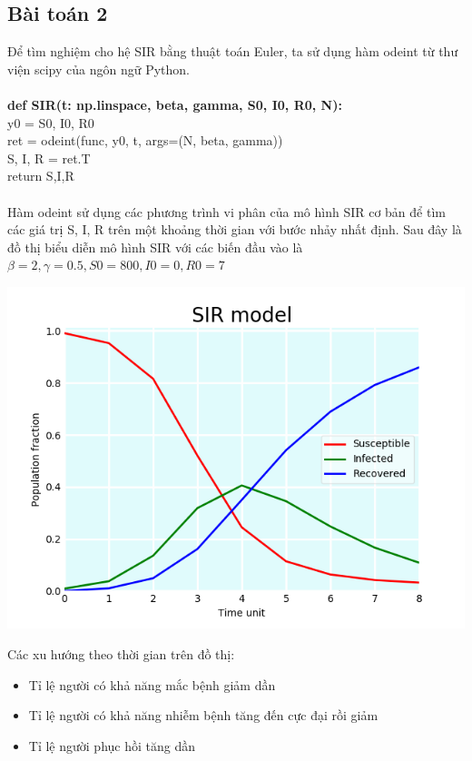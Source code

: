 \documentclass[a4paper]{article}
\begin{document}
\subsection{Bài toán 2}  
Để tìm nghiệm cho hệ SIR bằng thuật toán Euler, ta sử dụng hàm odeint từ thư viện scipy của ngôn ngữ Python.\\ \\
 \textbf{\quad def  SIR(t: np.linspace, beta, gamma, S0, I0, R0, N): \\}
\null \qquad \qquad y0 = S0, I0, R0 \\ 
\null \qquad \qquad ret = odeint(func, y0, t, args=(N, beta, gamma)) \\ 
\null \qquad \qquad S, I, R = ret.T \\ 
\null \qquad \qquad return S,I,R \\ \\
Hàm odeint sử dụng các phương trình vi phân của mô hình SIR cơ bản để tìm các giá trị S, I, R trên một khoảng thời gian với bước nhảy nhất định.
Sau đây là đồ thị biểu diễn mô hình SIR với các biến đầu vào là $\beta=2, \gamma=0.5, S0=800, I0=0, R0=7$
\begin{center}
\includegraphics[scale=0.6]{Images/Figure_1.png}
\end{center}
Các xu hướng theo thời gian trên đồ thị:
\begin{itemize}
\item Tỉ lệ người có khả năng mắc bệnh giảm dần
\item Tỉ lệ người có khả năng nhiễm bệnh tăng đến cực đại rồi giảm
\item Tỉ lệ người phục hồi tăng dần
\end{itemize}
\end{document}
